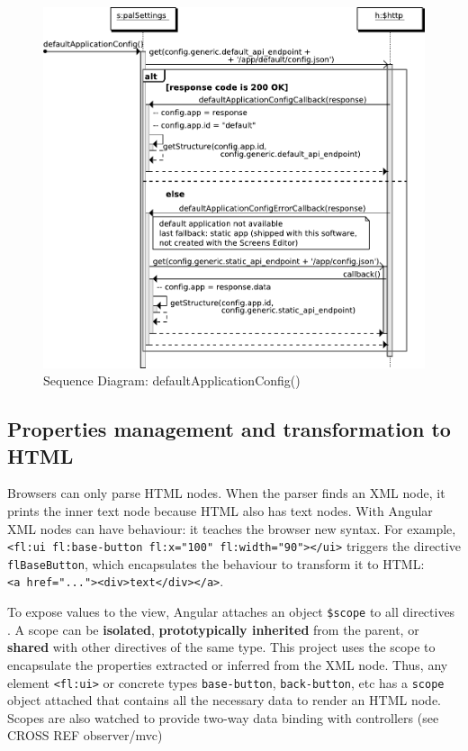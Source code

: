 \begin{figure}[htb]
    \centering
    \includegraphics{figures/design/seqdia/palSettings-defaultApplicationConfig.pdf}
    \caption{Sequence Diagram: defaultApplicationConfig()}
    \label{fig:design-seqdia-palSettings-defaultApplicationConfig}
\end{figure}

\FloatBarrier

\subsection{Properties management and transformation to \ac{HTML}}
Browsers can only parse \ac{HTML} nodes.
When the parser finds an \ac{XML} node, it prints the inner text node because \ac{HTML} also has text nodes.
With Angular \ac{XML} nodes can have behaviour: it teaches the browser new syntax.
For example, \\ \lstinline$<fl:ui fl:base-button fl:x="100" fl:width="90"></ui>$ triggers the directive \\ \lstinline$flBaseButton$, which encapsulates the behaviour to transform it to \ac{HTML}: \\ \lstinline$<a href="..."><div>text</div></a>$.

To expose values to the view, Angular attaches an object \texttt{\$scope} to all directives  .
A scope can be \textbf{isolated}, \textbf{prototypically inherited} from the parent, or \textbf{shared} with other directives of the same type.
This project uses the scope to encapsulate the properties extracted or inferred from the \ac{XML} node.
Thus, any element \lstinline$<fl:ui>$ or concrete types \lstinline$base-button$, \lstinline$back-button$, etc has a \texttt{scope} object attached that contains all the necessary data to render an \ac{HTML} node.
Scopes are also watched to provide two-way data binding with controllers (see CROSS REF observer/mvc)

